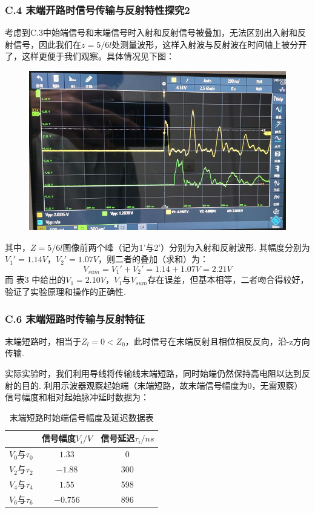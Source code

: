 \documentclass[UTF8]{ctexart}
\begin{document}
\subsubsection*{C.4 末端开路时信号传输与反射特性探究2}
考虑到C.3中始端信号和末端信号时入射和反射信号被叠加，无法区别出入射和反射信号，因此我们在$z=5/6l$处测量波形，这样入射波与反射波在时间轴上被分开了，这样更便于我们观察。具体情况见下图：
\begin{figure}[H]\begin{center}
    \includegraphics[scale=0.7]{32.PNG}
\end{center}\end{figure}
其中，$Z=5/6l$图像前两个峰（记为1'与2'）分别为入射和反射波形. 其幅度分别为$V_1'=1.14V$，$V_2'=1.07V$，则二者的叠加（求和）为：
\begin{equation}
    V_{sum}=V_1'+V_2'=1.14+1.07V=2.21V
\end{equation}
而 表3 中给出的$V_1=2.10V$，$V_1$与$V_{sum}$存在误差，但基本相等，二者吻合得较好，验证了实验原理和操作的正确性.

\subsubsection*{C.6 末端短路时传输与反射特征}
末端短路时，相当于$Z_l=0<Z_0$，此时信号在末端反射且相位相反反向，沿-z方向传输.\par
实际实验时，我们利用导线将传输线末端短路，同时始端仍然保持高电阻以达到反射的目的. 利用示波器观察起始端（末端短路，故末端信号幅度为0，无需观察）信号幅度和相对起始脉冲延时数据为：
\begin{table}[H]
    \centering
\begin{tabular}{|c|c|c|}
        \hline
        &信号幅度$V_i/V$&信号延迟$\tau_i/ns$\\
        \hline
        $V_0$与$\tau_0$&$1.33$&0\\
        \hline
        $V_2$与$\tau_2$&$-1.88$&300\\ 
        \hline
        $V_4$与$\tau_4$&$1.55$&598\\ 
        \hline
        $V_6$与$\tau_6$&$-0.756$&896\\ 
        \hline
    \end{tabular}  
    \caption{末端短路时始端信号幅度及延迟数据表} 
\end{table} 
\end{document}
